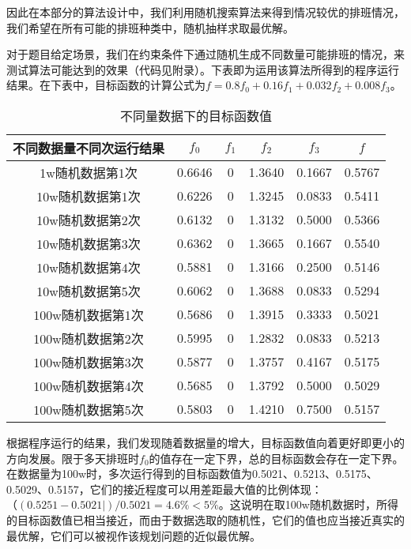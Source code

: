 \documentclass{article}
\begin{document}
	因此在本部分的算法设计中，我们利用随机搜索算法来得到情况较优的排班情况，我们希望在所有可能的排班种类中，随机抽样求取最优解。
	
	对于题目给定场景，我们在约束条件下通过随机生成不同数量可能排班的情况，来测试算法可能达到的效果（代码见附录）。下表即为运用该算法所得到的程序运行结果。在下表中，目标函数的计算公式为$f=0.8f_0+0.16f_1+0.032f_2+0.008f_3$。
	\begin{table}[!h]
		\centering
		\caption{不同量数据下的目标函数值}
		\begin{tabular}{|c|c|c|c|c|c|}
			\hline
			不同数据量不同次运行结果 & $f_0$  & $f_1$ & $f_2$  & $f_3$  & $f$    \\
			\hline
			1w随机数据第1次            & 0.6646 & 0     & 1.3640 & 0.1667 & 0.5767 \\
			10w随机数据第1次           & 0.6226 & 0     & 1.3245 & 0.0833 & 0.5411 \\
			10w随机数据第2次           & 0.6132 & 0     & 1.3132 & 0.5000 & 0.5366 \\
			10w随机数据第3次           & 0.6362 & 0     & 1.3665 & 0.1667 & 0.5540 \\
			10w随机数据第4次           & 0.5881 & 0     & 1.3166 & 0.2500 & 0.5146 \\
			10w随机数据第5次           & 0.6062 & 0     & 1.3688 & 0.0833 & 0.5294 \\
			100w随机数据第1次          & 0.5686 & 0     & 1.3915 & 0.3333 & 0.5021 \\
			100w随机数据第2次          & 0.5995 & 0     & 1.2832 & 0.0833 & 0.5213 \\
			100w随机数据第3次          & 0.5877 & 0     & 1.3757 & 0.4167 & 0.5175 \\
			100w随机数据第4次          & 0.5685 & 0     & 1.3792 & 0.5000 & 0.5029 \\
			100w随机数据第5次          & 0.5803 & 0     & 1.4210 & 0.7500 & 0.5157 \\
			\hline
		\end{tabular}
	\end{table}
	\newpage
	根据程序运行的结果，我们发现随着数据量的增大，目标函数值向着更好即更小的方向发展。限于多天排班时$f_0$的值存在一定下界，总的目标函数会存在一定下界。在数据量为100w时，多次运行得到的目标函数值为0.5021、0.5213、0.5175、0.5029、0.5157，它们的接近程度可以用差距最大值的比例体现：$（(0.5251-0.5021|)/0.5021=4.6\%<5\%$。这说明在取100w随机数据时，所得的目标函数值已相当接近，而由于数据选取的随机性，它们的值也应当接近真实的最优解，它们可以被视作该规划问题的近似最优解。
	
\end{document}
